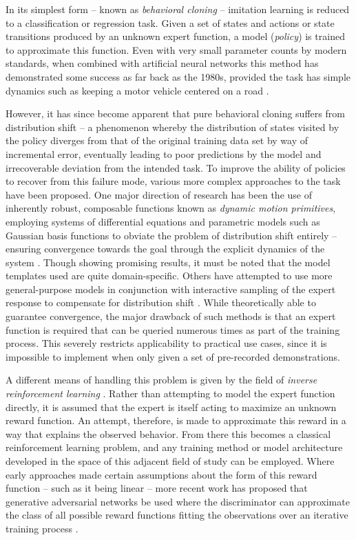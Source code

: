 \documentclass{article}
\begin{document}
In its simplest form -- known as \emph{behavioral cloning} -- imitation learning is reduced to a classification or regression task. Given a set of states and actions or state transitions produced by an unknown expert function, a model (\emph{policy}) is trained to approximate this function. Even with very small parameter counts by modern standards, when combined with artificial neural networks this method has demonstrated some success as far back as the 1980s, provided the task has simple dynamics such as keeping a motor vehicle centered on a road \citep{pomerleau1989alvinn}.

However, it has since become apparent that pure behavioral cloning suffers from distribution shift -- a phenomenon whereby the distribution of states visited by the policy diverges from that of the original training data set by way of incremental error, eventually leading to poor predictions by the model and irrecoverable deviation from the intended task. To improve the ability of policies to recover from this failure mode, various more complex approaches to the task have been proposed. One major direction of research has been the use of inherently robust, composable functions known as \emph{dynamic motion primitives}, employing systems of differential equations and parametric models such as Gaussian basis functions to obviate the problem of distribution shift entirely -- ensuring convergence towards the goal through the explicit dynamics of the system \citep{pastor2009learning}. Though showing promising results, it must be noted that the model templates used are quite domain-specific. Others have attempted to use more general-purpose models in conjunction with interactive sampling of the expert response to compensate for distribution shift \citep{ross2011no}. While theoretically able to guarantee convergence, the major drawback of such methods is that an expert function is required that can be queried numerous times as part of the training process. This severely restricts applicability to practical use cases, since it is impossible to implement when only given a set of pre-recorded demonstrations.

A different means of handling this problem is given by the field of \emph{inverse reinforcement learning} \citep{abbeel2004apprenticeship}. Rather than attempting to model the expert function directly, it is assumed that the expert is itself acting to maximize an unknown reward function. An attempt, therefore, is made to approximate this reward in a way that explains the observed behavior. From there this becomes a classical reinforcement learning problem, and any training method or model architecture developed in the space of this adjacent field of study can be employed. Where early approaches made certain assumptions about the form of this reward function -- such as it being linear -- more recent work has proposed that generative adversarial networks be used where the discriminator can approximate the class of all possible reward functions fitting the observations over an iterative training process \citep{ho2016generative,torabi2018generative}.
\end{document}
